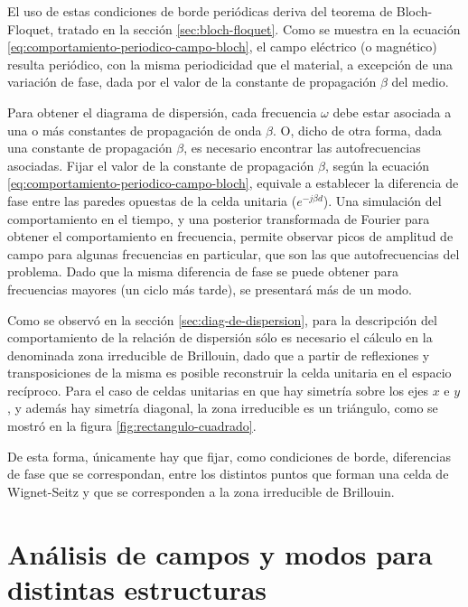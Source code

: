 El uso de estas condiciones de borde periódicas deriva del teorema de Bloch-Floquet, tratado en la sección \ref{sec:bloch-floquet}. Como se muestra en la ecuación \ref{eq:comportamiento-periodico-campo-bloch}, el campo eléctrico (o magnético) resulta periódico, con la misma periodicidad que el material, a excepción de una variación de fase, dada por el valor de la constante de propagación $\beta$ del medio.

Para obtener el diagrama de dispersión, cada frecuencia $\omega$ debe estar asociada a una o más constantes de propagación de onda $\beta$. O, dicho de otra forma, dada una constante de propagación $\beta$, es necesario encontrar las autofrecuencias asociadas. Fijar el valor de la constante de propagación $\beta$, según la ecuación \ref{eq:comportamiento-periodico-campo-bloch}, equivale a establecer la diferencia de fase entre las paredes opuestas de la celda unitaria ($e^{-j\beta d}$). Una simulación del comportamiento en el tiempo, y una posterior transformada de Fourier para obtener el comportamiento en frecuencia, permite observar picos de amplitud de campo para algunas frecuencias en particular, que son las que autofrecuencias del problema. Dado que la misma diferencia de fase se puede obtener para frecuencias mayores (un ciclo más tarde), se presentará más de un modo.

Como se observó en la sección \ref{sec:diag-de-dispersion}, para la descripción del comportamiento de la relación de dispersión sólo es necesario el cálculo en la denominada zona irreducible de Brillouin, dado que a partir de reflexiones y transposiciones de la misma es posible reconstruir la celda unitaria en el espacio recíproco. Para el caso de celdas unitarias en que hay simetría sobre los ejes $x$ e $y$, y además hay simetría diagonal, la zona irreducible es un triángulo, como se mostró en la figura \ref{fig:rectangulo-cuadrado}.

De esta forma, únicamente hay que fijar, como condiciones de borde, diferencias de fase que se correspondan, entre los distintos puntos que forman una celda de Wignet-Seitz y que se corresponden a la zona irreducible de Brillouin.



\section{Análisis de campos y modos para distintas estructuras}
\label{sec_estructuras_propuestas}

